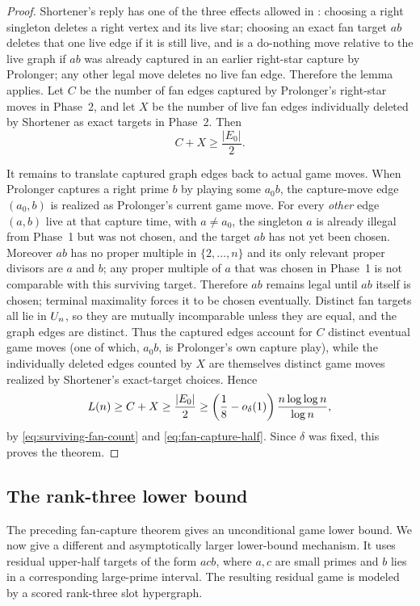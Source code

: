 \begin{proof}
Shortener's reply has one of the three effects allowed in
: choosing a right singleton deletes a right
vertex and its live star; choosing an exact fan target $ab$ deletes that one
live edge if it is still live, and is a do-nothing move relative to the live
graph if $ab$ was already captured in an earlier right-star capture by
Prolonger; any other legal move deletes no live fan edge.  Therefore the lemma applies.
Let $C$ be the number of fan edges captured by Prolonger's right-star moves in
Phase~2, and let $X$ be the number of live fan edges individually deleted by
Shortener as exact targets in Phase~2.  Then
\[
  C+X\ge \frac{|E_0|}{2}.
  \tag{4.8}\label{eq:fan-capture-half}
\]

It remains to translate captured graph edges back to actual game moves.  When
Prolonger captures a right prime $b$ by playing some $a_0b$, the capture-move
edge $(a_0,b)$ is realized as Prolonger's current game move.  For every
\emph{other} edge $(a,b)$ live at that capture time, with $a\ne a_0$, the
singleton $a$ is already illegal from Phase~1 but was not chosen, and the
target $ab$ has not yet been chosen.  Moreover $ab$ has no proper multiple in
$\{2,\ldots,n\}$ and its only relevant proper divisors are $a$ and $b$; any
proper multiple of $a$ that was chosen in Phase~1 is not comparable with this
surviving target.  Therefore $ab$ remains legal until $ab$ itself is chosen;
terminal maximality forces it to be chosen eventually.  Distinct fan targets
all lie in $U_n$, so they are mutually incomparable unless they are equal, and
the graph edges are distinct.  Thus the captured edges account for $C$ distinct
eventual game moves (one of which, $a_0b$, is Prolonger's own capture play),
while the individually deleted edges counted by $X$ are themselves distinct
game moves realized by Shortener's exact-target choices.  Hence
\[
  L(n)\ge C+X
  \ge
  \frac{|E_0|}{2}
  \ge
  \left(\frac18-o_\delta(1)\right)
  \frac{n\log\log n}{\log n},
\]
by \eqref{eq:surviving-fan-count} and \eqref{eq:fan-capture-half}.  Since
$\delta$ was fixed, this proves the theorem.
\end{proof}

\subsection{The rank-three lower bound}

The preceding fan-capture theorem gives an unconditional game lower bound.
We now give a different and asymptotically larger lower-bound mechanism.  It
uses residual upper-half targets of the
form $acb$, where $a,c$ are small primes and $b$ lies in a corresponding
large-prime interval.  The resulting residual game is modeled by a scored
rank-three slot hypergraph.

